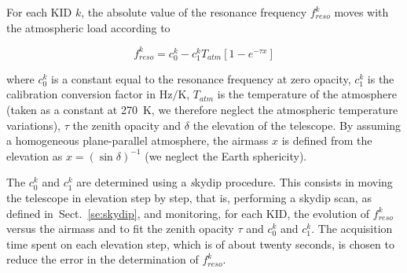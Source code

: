 For each KID $k$, the absolute value of the resonance frequency
$f_{reso}^k$ moves with the atmospheric load according to

\begin{equation}
f_{reso}^k  = c_0^k - c_1^k T_{atm}[1-e^{-\tau x}]
\label{eq:skydip}
\end{equation}


where $c_0^k$ is a constant equal to the resonance frequency at zero
opacity, $c_1^k$ is the calibration conversion factor in Hz$/$K,
$T_{atm}$ is the temperature of the atmosphere (taken as a constant at
270~K, we therefore neglect the atmospheric temperature variations),
$\tau$ the zenith opacity and $\delta$ the elevation of the
telescope.  By assuming a homogeneous plane-parallel atmosphere, the
airmass $x$ is defined from the elevation as $x
= \left(\sin\delta\right)^{-1}$ (we neglect the Earth sphericity).

The $c_0^k$ and $c_1^k$ are determined using a {\emph
skydip} procedure. This consists in moving the telescope in elevation
step by step, that is, performing a skydip scan, as defined
in~Sect.~\ref{se:skydip}, and monitoring, for each KID, the evolution
of $f_{reso}^k$ versus the airmass and to fit the zenith opacity
$\tau$ and $c_0^k$ and $c_1^k$. The acquisition time spent on each
elevation step, which is of about twenty seconds, is chosen to reduce
the error in the determination of $f_{reso}^k$.

